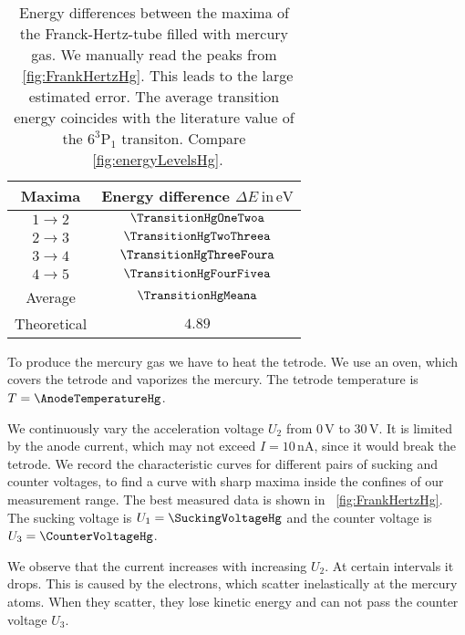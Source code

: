 \documentclass[a4paper,10pt,twocolumn]{article}
\newcommand{\volt}{\, \mathrm{V}}
\newcommand{\eV}{\, \mathrm{eV}}
\newcommand{\HgLevelA}{6^3\mathrm{P}_1}
\newcommand{\TheoreticalTransitionHga}{4.89}
\begin{document}
    \begin{table}[httb]
        \centering
        \begin{tabular}{c c}
            \hline \hline 
            Maxima & Energy difference $\Delta E \ \mathrm{in} \eV$ \\
            \hline
            $1 \rightarrow 2$ & $\TransitionHgOneTwoa$ \\
            $2 \rightarrow 3$ & $\TransitionHgTwoThreea$ \\
            $3 \rightarrow 4$ & $\TransitionHgThreeFoura$\\
            $4 \rightarrow 5$ & $\TransitionHgFourFivea$\\
            \hline
            Average & $\TransitionHgMeana$\\
            Theoretical & $\TheoreticalTransitionHga$ \\
            \hline 
            \hline
        \end{tabular}
        \caption{Energy differences between the maxima of the Franck-Hertz-tube filled with mercury gas.
        We manually read the peaks from ~\autoref{fig:FrankHertzHg}.
        This leads to the large estimated error.
        The average transition energy coincides with the literature value of the $\HgLevelA$ transiton.
        Compare ~\autoref{fig:energyLevelsHg}.}
        \label{tab:transitionHg}
    \end{table}
    
    To produce the mercury gas we have to heat the tetrode.
    We use an oven, which covers the tetrode and vaporizes the mercury.
    The tetrode temperature is $T = \AnodeTemperatureHg$.
    
    We continuously vary the acceleration voltage $U_2$ from $0\volt$ to $30\volt$.
    It is limited by the anode current, which 
    may not exceed $I = 10 \, \mathrm{nA}$, since it would break the tetrode.
    We record the characteristic curves for different pairs of sucking and counter voltages, to
    find a curve with sharp maxima inside the confines of our measurement range.
    The best measured data is shown in ~\autoref{fig:FrankHertzHg}.
    The sucking voltage is $U_1 = \SuckingVoltageHg$ and the counter voltage is $U_3 = \CounterVoltageHg$.
    
    We observe that the current increases with increasing $U_2$.
    At certain intervals it drops.
    This is caused by the electrons, which scatter inelastically at the mercury atoms.
    When they scatter, they lose kinetic energy and can not pass the counter voltage $U_3$.
    
\end{document}
